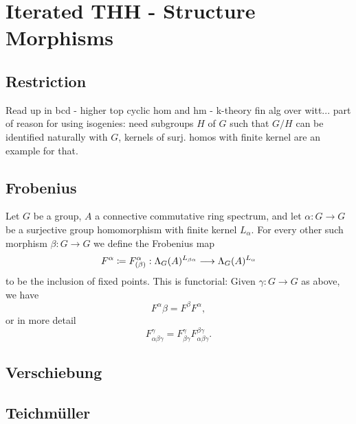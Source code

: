 \section{Iterated THH - Structure Morphisms}
  \subsection{Restriction}
    Read up in bcd - higher top cyclic hom and  hm - k-theory fin alg over
    witt...
    part of reason for using isogenies: need subgroups $H$ of $G$ such that
    $G/H$ can be identified naturally with $G$, kernels of surj. homos with
    finite kernel are an example for that.
  \subsection{Frobenius}
    \begin{defn}\label{def_frobenius_and_functoriality}
      Let $G$ be a group, $A$ a connective commutative ring spectrum, and let
      $\alpha : G \to G$ be a surjective group homomorphism with finite kernel
      $L_\alpha$. For every other such morphism $\beta: G \to G$ we define the
      Frobenius map
      \[ F^\alpha \coloneqq F^\alpha_{(\beta)}: \Lambda_G(A)^{ L_{\beta\alpha} } \longrightarrow
        \Lambda_G(A)^{ L_\alpha } \]
      to be the inclusion of fixed points. This is functorial: Given $\gamma: G
      \to G$ as above, we have
      \[ F^\alpha\beta = F^\beta F^\alpha, \]
      or in more detail
      \[ F^{\gamma}_{\alpha\beta\gamma} = %
        F^{\gamma}_{\beta\gamma} F^{\beta\gamma}_{\alpha\beta\gamma}. \]
    \end{defn}
  \subsection{Verschiebung}
  \subsection{Teichm\"uller}
    \begin{defn}\label{def_Delta_alpha}\cite[Sec. 6.2]{brun2010covering}
      \comm{[insert here def of $\Delta_\alpha: A \to T^\alpha$[}
    \end{defn}
    \begin{prop}\label{prop_iso_degree_0_structure_map_lambda}%
      \cite[Prop. 6.2.4]{brun2010covering}
    \end{prop}
